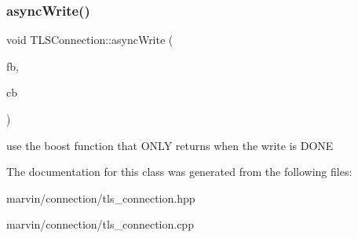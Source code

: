 \mbox{\label{class_t_l_s_connection_a986b8ea40c6708966dc5a499e18b39ae}} 
\subsubsection{\texorpdfstring{async\+Write()}{asyncWrite()}\hspace{0.1cm}{\footnotesize\ttfamily [2/2]}}
{\footnotesize\ttfamily void T\+L\+S\+Connection\+::async\+Write (\begin{DoxyParamCaption}\item[{\hyperlink{class_f_buffer}{F\+Buffer} \&}]{fb,  }\item[{Async\+Write\+Callback\+Type}]{cb }\end{DoxyParamCaption})}

use the boost function that O\+N\+LY returns when the write is D\+O\+NE 

The documentation for this class was generated from the following files\+:\begin{DoxyCompactItemize}
\item 
marvin/connection/tls\+\_\+connection.\+hpp\item 
marvin/connection/tls\+\_\+connection.\+cpp\end{DoxyCompactItemize}
